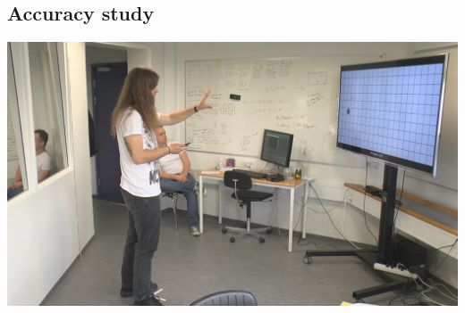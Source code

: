\subsection*{Accuracy study}
\includegraphics[width=\textwidth]{docs/appendix/files/accuracy.png}

\addbackpage